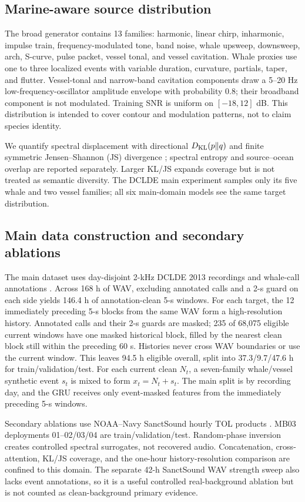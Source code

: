 \documentclass[conference]{IEEEtran}
\begin{document}
\subsection{Marine-aware source distribution}
The broad generator contains 13 families: harmonic, linear chirp, inharmonic,
impulse train, frequency-modulated tone, band noise, whale upsweep, downsweep,
arch, S-curve, pulse packet, vessel tonal, and vessel cavitation.  Whale proxies
use one to three localized events with variable duration, curvature, partials,
taper, and flutter.  Vessel-tonal and narrow-band cavitation components draw a
5--20 Hz low-frequency-oscillator amplitude envelope with probability 0.8;
their broadband component is not modulated.  Training SNR is uniform on
$[-18,12]$ dB.  This distribution is intended to cover contour and modulation
patterns, not to claim species identity.

We quantify spectral displacement with directional $D_{\rm KL}(p\|q)$ and
finite symmetric Jensen--Shannon (JS) divergence \cite{lin1991divergence};
spectral entropy and source--ocean overlap are reported separately.  Larger
KL/JS expands coverage but is not treated as semantic diversity.  The DCLDE
main experiment samples only its five whale and two vessel families; all six
main-domain models see the same target distribution.

\subsection{Main data construction and secondary ablations}
The main dataset uses day-disjoint 2-kHz DCLDE 2013 recordings and whale-call
annotations \cite{gillespie2019dclde,shiu2020marine}.  Across 168 h of WAV,
excluding annotated calls and a 2-s guard on each side yields 146.4 h of
annotation-clean 5-s windows.  For each target, the 12 immediately preceding
5-s blocks from the same WAV form a high-resolution history.  Annotated calls
and their 2-s guards are masked; 235 of 68,075 eligible current windows have
one masked historical block, filled by the nearest clean block still within
the preceding 60 s.  Histories never cross WAV boundaries or use the current
window.  This leaves 94.5 h eligible overall, split into 37.3/9.7/47.6 h
for train/validation/test.
For each current clean $N_t$, a seven-family whale/vessel synthetic event $s_t$ is mixed to
form $x_t=N_t+s_t$.  The main split is by recording day, and the GRU receives
only event-masked features from the immediately preceding 5-s windows.

Secondary ablations use NOAA--Navy SanctSound hourly TOL products
\cite{noaa2020sanctsound}.  MB03 deployments 01--02/03/04 are
train/validation/test.  Random-phase inversion creates controlled spectral
surrogates, not recovered audio.  Concatenation, cross-attention, KL/JS
coverage, and the one-hour history-resolution comparison are confined to this
domain.  The separate 42-h SanctSound WAV strength sweep also lacks event
annotations, so it is a useful controlled real-background ablation but is not
counted as clean-background primary evidence.
\end{document}
